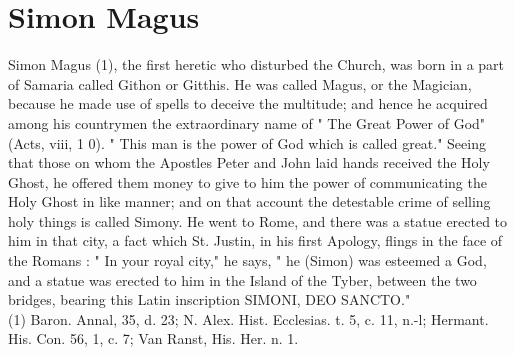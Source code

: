 \documentclass[12pt]{book}
\begin{document}
\section{Simon Magus}
Simon Magus (1), the first heretic who disturbed the Church, was born in a part of Samaria called
Githon or Gitthis. He was called Magus, or the Magician, because he made use of spells to deceive the
multitude; and hence he acquired among his countrymen the extraordinary name of " The Great Power
of God" (Acts, viii, 1 0). " This man is the power of God which is called great." Seeing that those on whom
the Apostles Peter and John laid hands received the Holy Ghost, he offered them money to give to him
the power of communicating the Holy Ghost in like manner; and on that account the detestable crime of
selling holy things is called Simony. He went to Rome, and there was a statue erected to him in that city, a
fact which St. Justin, in his first Apology, flings in the face of the Romans : " In your royal city," he says, "
he (Simon) was esteemed a God, and a statue was erected to him in the Island of the Tyber, between the
two bridges, bearing this Latin inscription SIMONI, DEO SANCTO."\\
(1) Baron. Annal, 35, d. 23; N. Alex. Hist. Ecclesias. t. 5, c. 11, n.-l; Hermant. His. Con. 56, 1, c. 7; Van
Ranst, His. Her. n. 1.\\
\end{document}
